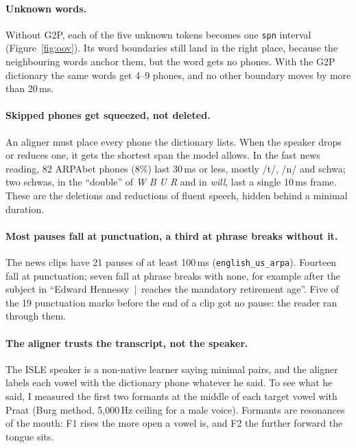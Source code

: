 \documentclass[11pt,a4paper]{article}
\newcommand{\code}[1]{\texttt{#1}}
\begin{document}
\paragraph{Unknown words.} Without G2P, each of the five unknown tokens becomes one \code{spn} interval
(Figure~\ref{fig:oov}). Its word boundaries still land in the right place, because the neighbouring words anchor
them, but the word gets no phones. With the G2P dictionary the same words get 4--9 phones, and no other boundary
moves by more than 20\,ms.

\paragraph{Skipped phones get squeezed, not deleted.} An aligner must place every phone the dictionary lists. When
the speaker drops or reduces one, it gets the shortest span the model allows. In the fast news reading, 82
ARPAbet phones (8\%) last 30\,ms or less, mostly /t/, /n/ and schwa; two schwas, in the ``double'' of
\emph{W B U R} and in \emph{will}, last a single 10\,ms frame. These are the deletions and reductions of fluent
speech, hidden behind a minimal duration.

\paragraph{Most pauses fall at punctuation, a third at phrase breaks without it.} The news clips have 21 pauses of
at least 100\,ms (\code{english\_us\_arpa}). Fourteen fall at punctuation; seven fall at phrase breaks with none, for
example after
the subject in ``Edward Hennessy \,|\, reaches the mandatory retirement age''. Five of the 19 punctuation marks
before the end of a clip got no pause: the reader ran through them.

\paragraph{The aligner trusts the transcript, not the speaker.} The ISLE speaker is a non-native learner saying
minimal pairs, and the aligner labels each vowel with the dictionary phone whatever he said. To see what he said, I
measured the first two formants at the middle of each target vowel with Praat (Burg method, 5,000\,Hz ceiling for a
male voice). Formants are resonances of the mouth: F1 rises the more open a vowel is, and F2 the further forward
the tongue sits.
\end{document}
